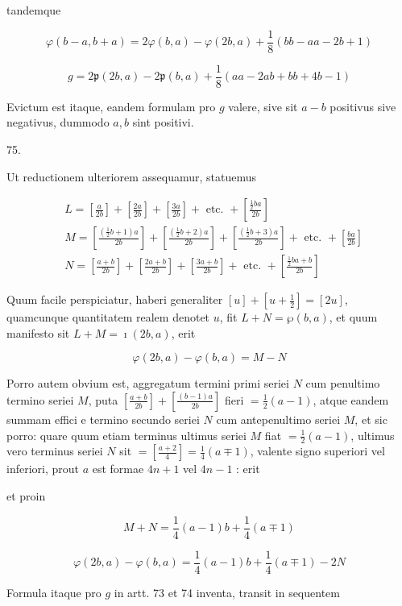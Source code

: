 \documentclass[10pt]{article}
\begin{document}
tandemque

\[
\varphi(b-a, b+a)=2 \varphi(b, a)-\varphi(2 b, a)+\frac{1}{8}(b b-a a-2 b+1)
\]

\[
g=2 \mathfrak{p}(2 b, a)-2 \mathfrak{p}(b, a)+\frac{1}{8}(a a-2 a b+b b+4 b-1)
\]

Evictum est itaque, eandem formulam pro \(g\) valere, sive sit \(a-b\) positivus sive negativus, dummodo \(a, b\) sint positivi.

75.

Ut reductionem ulteriorem assequamur, statuemus

\[
\begin{aligned}
& L=\left[\frac{a}{2 b}\right]+\left[\frac{2 a}{2 b}\right]+\left[\frac{3 a}{2 b}\right]+\text { etc. }+\left[\frac{\frac{1}{2} b a}{2 b}\right] \\
& M=\left[\frac{\left(\frac{1}{2} b+1\right) a}{2 b}\right]+\left[\frac{\left(\frac{1}{2} b+2\right) a}{2 b}\right]+\left[\frac{\left(\frac{1}{2} b+3\right) a}{2 b}\right]+\text { etc. }+\left[\frac{b a}{2 b}\right] \\
& N=\left[\frac{a+b}{2 b}\right]+\left[\frac{2 a+b}{2 b}\right]+\left[\frac{3 a+b}{2 b}\right]+\text { etc. }+\left[\frac{\frac{1}{2} b a+b}{2 b}\right]
\end{aligned}
\]

Quum facile perspiciatur, haberi generaliter \([u]+\left[u+\frac{1}{2}\right]=[2 u]\), quamcunque quantitatem realem denotet \(u\), fit \(L+N=\wp(b, a)\), et quum manifesto sit \(L+M=\mathfrak{\imath}(2 b, a)\), erit

\[
\varphi(2 b, a)-\varphi(b, a)=M-N
\]

Porro autem obvium est, aggregatum termini primi seriei \(N\) cum penultimo termino seriei \(M\), puta \(\left[\frac{a+b}{2 b}\right]+\left[\frac{(b-1) a}{2 b}\right]\) fieri \(=\frac{1}{2}(a-1)\), atque eandem summam effici e termino secundo seriei \(N\) cum antepenultimo seriei \(M\), et sic porro: quare quum etiam terminus ultimus seriei \(M\) fiat \(=\frac{1}{2}(a-1)\), ultimus vero terminus seriei \(N\) sit \(=\left[\frac{a+2}{4}\right]=\frac{1}{4}(a \mp 1)\), valente signo superiori vel inferiori, prout \(a\) est formae \(4 n+1\) vel \(4 n-1\) : erit

et proin

\[
M+N=\frac{1}{4}(a-1) b+\frac{1}{4}(a \mp 1)
\]

\[
\varphi(2 b, a)-\varphi(b, a)=\frac{1}{4}(a-1) b+\frac{1}{4}(a \mp 1)-2 N
\]

Formula itaque pro \(g\) in artt. 73 et 74 inventa, transit in sequentem
\end{document}
